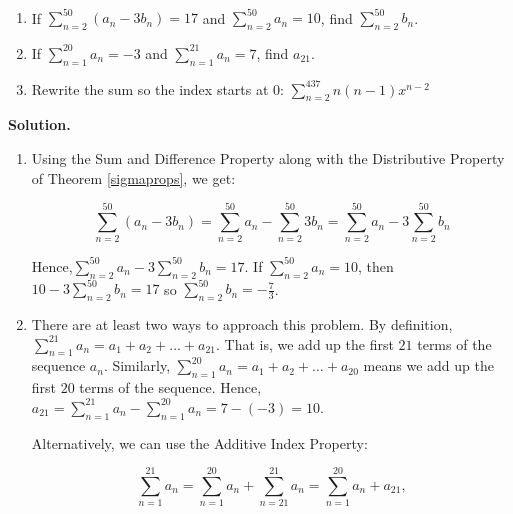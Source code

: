\documentclass{ximera}
\begin{document}
\begin{example}  \label{summationpropsex}  $~$

\begin{enumerate}

\item  If $\displaystyle{ \sum_{n=2}^{50}  \left(a_{n}  - 3 b_{n} \right) = 17}$ and $\displaystyle{ \sum_{n=2}^{50}  a_{n}  = 10}$, find $\displaystyle{ \sum_{n=2}^{50}  b_{n}}$.

\item If $\displaystyle{ \sum_{n=1}^{20}  a_{n}  = -3}$ and $\displaystyle{ \sum_{n=1}^{21}  a_{n}  = 7}$, find $a_{21}$.

\item  Rewrite the sum so the index starts at $0$: $\displaystyle{ \sum_{n=2}^{437} n (n-1) x^{n-2}}$


\end{enumerate}

{\bf Solution.}

\begin{enumerate}

\item Using the Sum and Difference Property along with the Distributive Property  of Theorem \ref{sigmaprops}, we get:

\[  \sum_{n=2}^{50}  \left(a_{n}  - 3 b_{n} \right) =  \sum_{n=2}^{50}  a_{n}  -  \sum_{n=2}^{50} 3 b_{n}  = \sum_{n=2}^{50}  a_{n}  - 3 \sum_{n=2}^{50} b_{n}\]

Hence,$\displaystyle{\sum_{n=2}^{50}  a_{n}  - 3 \sum_{n=2}^{50} b_{n} = 17}$. If $\displaystyle{ \sum_{n=2}^{50}  a_{n}  = 10}$, then $\displaystyle{10  - 3 \sum_{n=2}^{50} b_{n} = 17}$ so  $\displaystyle{\sum_{n=2}^{50} b_{n} = -\frac{7}{3}}$.

\item  There are at least two ways to approach this problem.  By definition,  $\displaystyle{ \sum_{n=1}^{21}  a_{n} = a_{1} + a_{2} + \ldots + a_{21}}$.  That is, we add up the first $21$ terms of the sequence $a_{n}$.  Similarly, $\displaystyle{ \sum_{n=1}^{20}  a_{n} = a_{1} + a_{2} + \ldots + a_{20}}$ means we add up the first $20$ terms of the sequence.  Hence, $a_{21} = \displaystyle{ \sum_{n=1}^{21}  a_{n}  - \sum_{n=1}^{20}  a_{n}  = 7-(-3) = 10.}$

Alternatively, we can use the Additive Index Property: 

\[ \sum_{n=1}^{21}  a_{n} = \sum_{n=1}^{20}  a_{n} + \sum_{n=21}^{21}  a_{n} =  \sum_{n=1}^{20}  a_{n}  + a_{21},\]


\end{enumerate}
\end{example}
\end{document}
